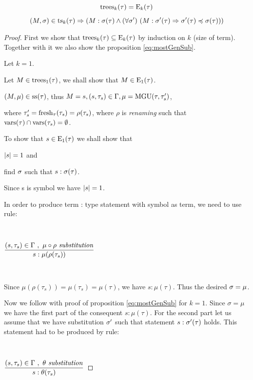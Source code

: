 \documentclass[a4paper,oneside]{memoir}
\begin{document}
\begin{proposition}
\begin{equation}\label{eq:treesEqE}
\operatorname{trees}_{k}(\tau) = \operatorname{E}_{k}(\tau)
\end{equation}
\begin{equation}\label{eq:mostGenSub}
(M,\sigma) \in \operatorname{ts}_{k}(\tau) \Rightarrow (M : \sigma(\tau) \wedge (\forall \sigma^\prime)\ (M : \sigma^\prime(\tau) \Rightarrow \sigma^\prime(\tau) \preccurlyeq \sigma(\tau)))
\end{equation}

\begin{proof}
First we show that $\operatorname{trees}_{k}(\tau) \subseteq \operatorname{E}_{k}(\tau)$ by induction on $k$ (size of term).
Together with it we also show the proposition \ref{eq:mostGenSub}.

Let $k = 1$. 

Let $M \in \operatorname{trees}_{1}(\tau)$, we shall show that $M \in \operatorname{E}_{1}(\tau)$.

$(M,\mu) \in \operatorname{ss}(\tau)$, thus $M = s, (s,\tau_s) \in \Gamma, \mu = \operatorname{MGU}(\tau,\tau^\prime_s)$,

where $\tau^\prime_s = \operatorname{fresh}_{\tau}(\tau_s) = \rho(\tau_s)$, where $\rho$ is \textit{renaming} 
such that $\operatorname{vars}(\tau) \cap \operatorname{vars}(\tau_s) = \emptyset$.

To show that $s \in \operatorname{E}_{1}(\tau)$ we shall show that 

$\lvert s \rvert = 1$ and 

find $\sigma$ such that $ s : \sigma(\tau)$. 

Since s is symbol we have $\lvert s \rvert = 1$.


In order to produce term : type statement with symbol as term, we need to use \subAx rule:

~

$\dfrac{(s,\tau_s) \in \Gamma\ ,\ \mu \circ \rho\ \mathit{substitution}}{s : \mu(\rho(\tau_s))}$

~

Since $\mu(\rho(\tau_s)) = \mu(\tau_s) = \mu(\tau)$, we have $s : \mu(\tau)$.
Thus the desired $\sigma = \mu$.

Now we follow with proof of proposition \ref{eq:mostGenSub} for $k = 1$.
Since $\sigma = \mu$ we have the first part of the consequent $s : \mu(\tau)$. 
For the second part let us assume that we have substitution $\sigma^\prime$ such that 
statement $s : \sigma^\prime(\tau)$ holds. This statement had to be produced by \subAx rule:

~

$\dfrac{(s,\tau_s) \in \Gamma\ ,\ \theta\ \mathit{substitution}}{s : \theta(\tau_s)}$


\end{proof}
\end{proposition}
\end{document}
